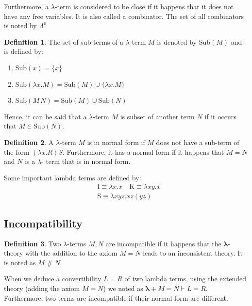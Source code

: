 \documentclass[11pt]{article}
\theoremstyle{definition}
\newtheorem{definition}{Definition}[section]
\theoremstyle{remark}
\theoremstyle{remark}
\theoremstyle{definition}
\newcommand{\dneq}{\,\, \# \,\,}
\renewcommand{\S}{\pmb{\mathrm{S}}}
\newcommand{\I}{\pmb{\mathrm{I}}}
\newcommand{\K}{\pmb{\mathrm{K}}}
\begin{document}
Furthermore, a $\lambda$-term is considered to be close if it happens that it
does not have any free variables. It is also called a combinator. The set of all
combinators is noted by $\Lambda^0$

\begin{definition}
  The set of sub-terms of a $\lambda$-term $M$ is denoted by Sub$(M)$ and is
  defined by:
  \begin{enumerate}
    \item Sub$(x) = \{x\}$
    \item Sub$(\lambda x.M) = \text{Sub}(M)\cup\{\lambda x.M\}$
    \item Sub$(M\,N) = \text{Sub}(M) \cup \text{Sub}(N)$
  \end{enumerate}
  Hence, it can be said that a $\lambda$-term $M$ is subset of another term $N$
  if it occurs that $M \in \text{Sub}(N)$.
\end{definition}

\begin{definition}
  A $\lambda$-term $M$ is in normal form if $M$ does not have a sub-term of the
  form $(\lambda x.R)S$. Furthermore, it has a normal form if it happens that
  $M = N$ and $N$ is a $\lambda$- term that is in normal form.
\end{definition}

Some important lambda terms are defined by:
%
\begin{equation*}
  \begin{split}
    &\I \equiv \lambda x. x \quad \K \equiv \lambda xy. x \\
    &\S \equiv \lambda xyz. xz(yz)
  \end{split}
\end{equation*}

\subsection{Incompatibility}

\begin{definition}
  Two $\lambda$-terms $M, N$ are incompatible if it happens that the
  $\pmb{\lambda}$-theory with the addition to the axiom $M = N$ leads to an
  inconsistent theory. It is noted as $M \dneq N$
\end{definition}

When we deduce a convertibility $L = R$ of two lambda terms, using the extended
theory (adding the axiom $M=N$) we noted as
$\pmb{\lambda} + M = N \vdash L = R$. Furthermore, two terms are incompatible if
their normal form are different.
\end{document}
